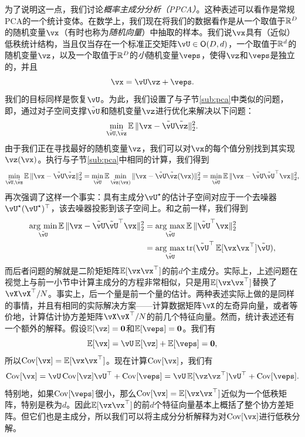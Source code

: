 \documentclass[../../book-main.tex]{subfiles}
\begin{document}
为了说明这一点，我们讨论\textit{概率主成分分析（PPCA）}。这种表述可以看作是常规PCA的一个统计变体。在数学上，我们现在将我们的数据看作是从一个取值于\(\mathbb{R}^{D}\)的随机变量\(\vx\)（有时也称为\textit{随机向量}）中抽取的样本。我们说\(\vx\)具有（近似）低秩统计结构，当且仅当存在一个标准正交矩阵\(\vU \in \O(D, d)\)，一个取值于\(\mathbb{R}^{d}\)的随机变量\(\vz\)，以及一个取值于\(\mathbb{R}^{D}\)的\textit{小}随机变量\(\veps\)，使得\(\vz\)和\(\veps\)是独立的，并且
\begin{equation}
    \vx = \vU\vz + \veps.
\end{equation}
我们的目标同样是恢复\(\vU\)。为此，我们设置了与子节\eqref{sub:pca}中类似的问题，即，通过对子空间支撑\(\tilde{\vU}\)和随机变量\(\vz\)进行优化来解决以下问题：
\begin{equation}
    \min_{\tilde{\vU}, \tilde{\vz}}\Ex\norm{\vx - \tilde{\vU}\tilde{\vz}}_{2}^{2}.
\end{equation}
由于我们正在寻找最好的随机变量\(\vz\)，我们可以对\(\vx\)的每个值分别找到其实现\(\vz(\vx)\)。执行与子节\eqref{sub:pca}中相同的计算，我们得到 %
\begin{equation}\label{eq:ppca_denoising}
    \min_{\tilde{\vU}, \tilde{\vz}}\Ex\norm{\vx - \tilde{\vU}\tilde{\vz}}_{2}^{2} = \min_{\tilde{\vU}}\Ex\min_{\tilde{\vz}(\vx)}\norm{\vx - \tilde{\vU}\tilde{\vz}(\vx)}_{2}^{2} = \min_{\tilde{\vU}}\Ex\norm{\vx - \tilde{\vU}\tilde{\vU}^{\top}\vx}_{2}^{2},
\end{equation}
再次强调了这样一个事实：具有主成分\(\vU^{\star}\)的估计子空间对应于一个去噪器\(\vU^{\star}(\vU^{\star})^{\top}\)，该去噪器投影到该子空间上。和之前一样，我们得到
\begin{align}\label{eq:PPCA}
    \argmin_{\tilde{\vU}}\Ex\norm{\vx - \tilde{\vU}\tilde{\vU}^{\top}\vx}_{2}^{2} 
    &= \argmax_{\tilde{\vU}}\Ex\norm{\tilde{\vU}^{\top}\vx}_{2}^{2} \\
    &= \argmax_{\tilde{\vU}}\tr(\tilde{\vU}^{\top}\Ex[\vx\vx^{\top}]\tilde{\vU}),
\end{align}
而后者问题的解就是二阶矩矩阵\(\Ex[\vx\vx^{\top}]\)的前\(d\)个主成分。实际上，上述问题在视觉上与前一小节中计算主成分的方程非常相似，只是用\(\Ex[\vx\vx^{\top}]\)替换了\(\vX\vX^{\top}/N\)。事实上，后一个量是前一个量的估计。两种表述实际上做的是同样的事情，并且有相同的实际解决方案——计算数据矩阵\(\vX\)的左奇异向量，或者等价地，计算估计协方差矩阵\(\vX\vX^{\top}/N\)的前几个特征向量。然而，统计表述还有一个额外的解释。假设\(\Ex[\vz] = \vzero\)和\(\Ex[\veps] = \vzero\)。我们有
\begin{equation}
    \Ex[\vx] = \vU\Ex[\vz] + \Ex[\veps] = \vzero,
\end{equation}
所以\(\Cov[\vx] = \Ex[\vx\vx^{\top}]\)。现在计算\(\Cov[\vx]\)，我们有
\begin{equation}
    \Cov[\vx] = \vU\Cov[\vz]\vU^{\top} + \Cov[\veps] = \vU\Ex[\vz\vz^{\top}]\vU^{\top} + \Cov[\veps].
\end{equation}
特别地，如果\(\Cov[\veps]\)很小，那么\(\Cov[\vx] = \Ex[\vx\vx^{\top}]\)近似为一个低秩矩阵，特别是秩为\(d\)。因此\(\Ex[\vx\vx^{\top}]\)的前\(d\)个特征向量基本上概括了整个协方差矩阵。但它们也是主成分，所以我们可以将主成分分析解释为对\(\Cov[\vx]\)进行低秩分解。
\end{document}
